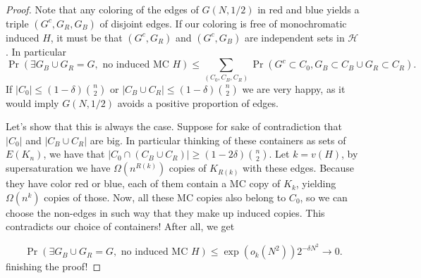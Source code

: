 \begin{proof}
	Note that any coloring of the edges of $G(N,1/2)$ in red and blue
	yields a triple
	$(G^{c}, G_R, G_B)$ of disjoint edges. If our coloring is free of
	monochromatic induced
	$H$, it must be that $(G^c, G_R)$ and $(G^c, G_B)$ are independent
	sets in $\mathcal{H}$. In particular
	\[
		\Pr(\exists G_B \cup G_R = G, \text{ no induced MC } H) \leq
		\sum_{(C_0,C_B,C_R)} \Pr(G^c \subset C_0, G_B \subset C_B \cup G_R
		\subset C_R).
	\]
	If $|C_0| \leq (1-\delta)\binom{n}{2}$ or $|C_B \cup C_R| \leq
	(1-\delta) \binom{n}{2}$
	we are very happy, as it would imply $G(N,1/2)$ avoids a positive
	proportion of edges.

	Let's show that this is always the case. Suppose for sake of contradiction that
	$|C_0|$ and $|C_B \cup C_R|$ are big. In particular thinking of
	these containers
	as sets of $E(K_n)$, we have  that $|C_0 \cap (C_B \cup C_R)| \geq
	(1-2\delta)\binom{n}{2}$.
	Let $k = v(H)$, by supersaturation we have $\Omega(n^{R(k)})$ copies
	of $K_{R(k)}$ with
	these edges. Because they have color red or blue, each of them
	contain a MC copy
	of $K_k$, yielding $\Omega(n^{k})$ copies of those. Now, all these MC copies
	also belong to $C_0$, so we can choose the non-edges in such way
	that they make up
	induced copies. This contradicts our choice of containers! After all, we get

	\[
		\Pr(\exists G_B \cup G_R = G, \text{ no induced MC } H) \leq
		\exp(o_k(N^2)) 2^{-\delta N^2} \to 0.
	\]
	finishing the proof!
\end{proof}
